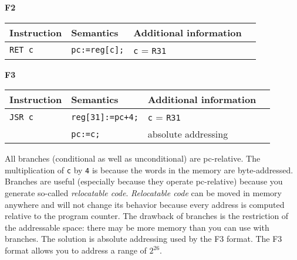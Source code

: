 \par{
    \noindent
    \textbf{F2}
}

\par{
    \noindent
    \begin{tabular}{llll}
        \hline
        Instruction 	& Semantics 				& Additional information		\\
        \hline
        \hline
        \texttt{RET c}	&   \texttt{pc:=reg[c];}	&	\texttt{c} = \texttt{R31}	\\
        \hline
    \end{tabular}   
}

\par{
    \noindent
    \textbf{F3}
}

\par{
    \noindent
    \begin{tabular}{llll}
        \hline
        Instruction 	& Semantics 				& Additional information		\\
        \hline
        \hline
        \texttt{JSR c}	&   \texttt{reg[31]:=pc+4;}	&	\texttt{c} = \texttt{R31}	\\
						&	\texttt{pc:=c;}			&	absolute addressing			\\
        \hline
    \end{tabular}   
}

\par{
	\noindent
	All branches (conditional as well as unconditional) are pc-relative. The multiplication of \texttt{c} by \texttt{4} is because the words in the memory are byte-addressed. Branches are useful (especially because they operate pc-relative) because you generate so-called \textit{relocatable code}. \textit{Relocatable code} can be moved in memory anywhere and will not change its behavior because every address is computed relative to the program counter. The drawback of branches is the restriction of the addressable space: there may be more memory than you can use with branches. The solution is absolute addressing used by the F3 format. The F3 format allows you to address a range of $2^{26}$.
}
